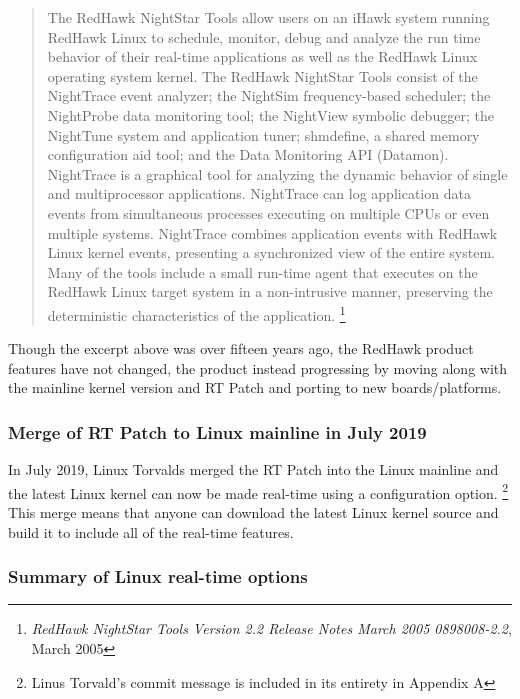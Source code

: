 \documentclass[12pt]{article}
\begin{document}
\begin{quote}
The RedHawk NightStar Tools allow users on an iHawk system running
RedHawk Linux to schedule, monitor, debug and analyze the run time behavior of
their real-time applications as well as the RedHawk Linux operating system
kernel.  The RedHawk NightStar Tools consist of the NightTrace event analyzer;
the NightSim frequency-based scheduler; the NightProbe data monitoring tool; the
NightView symbolic debugger; the NightTune system and application tuner;
shmdefine, a shared memory configuration aid tool; and the Data Monitoring API
(Datamon).  NightTrace is a graphical tool for analyzing the dynamic behavior of
single and multiprocessor applications. NightTrace can log application data
events from simultaneous processes executing on multiple CPUs or even multiple
systems. NightTrace combines application events with RedHawk Linux kernel
events, presenting a synchronized view of the entire system.  Many of the tools
include a small run-time agent that executes on the RedHawk Linux target system
in a non-intrusive manner, preserving the deterministic characteristics of the
application.%
\footnote{\emph{RedHawk NightStar Tools Version 2.2 Release Notes March 2005
0898008-2.2}, March 2005}
\end{quote}

Though the excerpt above was over fifteen years ago, the RedHawk product
features have not changed, the product instead progressing by moving along with
the mainline kernel version and RT Patch and porting to new boards/platforms.

\subsubsection{Merge of RT Patch to Linux mainline in July 2019}
In July 2019, Linux Torvalds merged the RT Patch into the Linux mainline and the
latest Linux kernel can now be made real-time using a configuration option.%
\footnote{Linus Torvald's commit message is included in its entirety in Appendix
A}
This merge means that anyone can download the latest Linux kernel source and
build it to include all of the real-time features.

\subsubsection{Summary of Linux real-time options}
\end{document}
